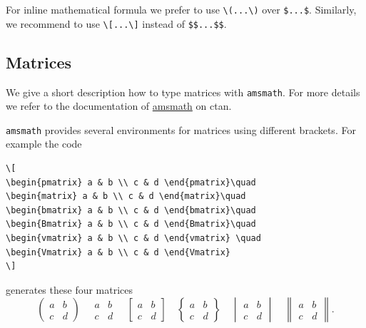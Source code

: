 \documentclass{zbMATH}
\begin{document}
For inline mathematical formula we prefer to use \verb|\(...\)| over \verb|$...$|. Similarly, we recommend to use \verb|\[...\]| instead of \verb|$$...$$|.

\subsection*{Matrices}

We give a short description how to type matrices with \texttt{amsmath}. For more details we refer to the documentation of \href{https://www.ams.org/arc/resources/amslatex-about.html}{amsmath} on ctan.

\texttt{amsmath} provides several environments for matrices using different brackets. For example the code 
\begin{verbatim}
\[
\begin{pmatrix} a & b \\ c & d \end{pmatrix}\quad
\begin{matrix} a & b \\ c & d \end{matrix}\quad 
\begin{bmatrix} a & b \\ c & d \end{bmatrix}\quad
\begin{Bmatrix} a & b \\ c & d \end{Bmatrix}\quad
\begin{vmatrix} a & b \\ c & d \end{vmatrix} \quad
\begin{Vmatrix} a & b \\ c & d \end{Vmatrix}
\]
\end{verbatim}

generates these four matrices
\[
\begin{pmatrix} a & b \\ c & d \end{pmatrix}\quad
\begin{matrix} a & b \\ c & d \end{matrix}\quad 
\begin{bmatrix} a & b \\ c & d \end{bmatrix}\quad
\begin{Bmatrix} a & b \\ c & d \end{Bmatrix}\quad
\begin{vmatrix} a & b \\ c & d \end{vmatrix} \quad
\begin{Vmatrix} a & b \\ c & d \end{Vmatrix}.
\]
\end{document}
